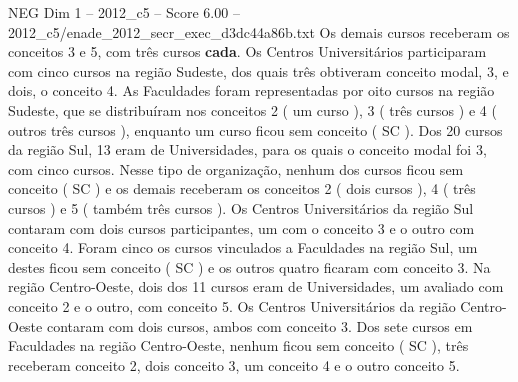 \begin{textsample}{NEG Dim 1 – 2012\_c5 – Score 6.00 – 2012\_c5/enade\_2012\_secr\_exec\_d3dc44a86b.txt}
Os demais cursos receberam os conceitos 3 e 5, com três cursos \textbf{cada}.
Os Centros Universitários participaram com cinco cursos na região Sudeste, dos quais três obtiveram conceito modal, 3, e dois, o conceito 4.
As Faculdades foram representadas por oito cursos na região Sudeste, que se distribuíram nos conceitos 2 ( um curso ), 3 ( três cursos ) e 4 ( outros três cursos ), enquanto um curso ficou sem conceito ( SC ).
Dos 20 cursos da região Sul, 13 eram de Universidades, para os quais o conceito modal foi 3, com cinco cursos.
Nesse tipo de organização, nenhum dos cursos ficou sem conceito ( SC ) e os demais receberam os conceitos 2 ( dois cursos ), 4 ( três cursos ) e 5 ( também três cursos ).
Os Centros Universitários da região Sul contaram com dois cursos participantes, um com o conceito 3 e o outro com conceito 4.
Foram cinco os cursos vinculados a Faculdades na região Sul, um destes ficou sem conceito ( SC ) e os outros quatro ficaram com conceito 3.
Na região Centro-Oeste, dois dos 11 cursos eram de Universidades, um avaliado com conceito 2 e o outro, com conceito 5.
Os Centros Universitários da região Centro-Oeste contaram com dois cursos, ambos com conceito 3.
Dos sete cursos em Faculdades na região Centro-Oeste, nenhum ficou sem conceito ( SC ), três receberam conceito 2, dois conceito 3, um conceito 4 e o outro conceito 5.

\end{textsample}

